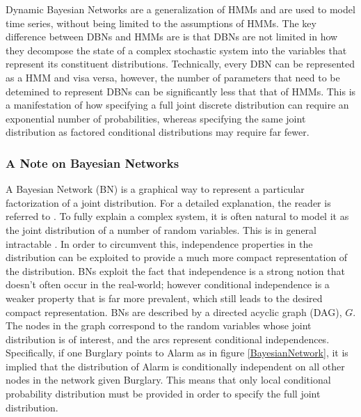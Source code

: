 
\placeholder{}
Dynamic Bayesian Networks are a generalization of HMMs and are used to model time series, without being limited to the assumptions of HMMs. The key difference between DBNs and HMMs are is that DBNs are not limited in how they decompose the state of a complex stochastic system into the variables that represent its constituent distributions\cite{AIAMA}. Technically, every DBN can be represented as a HMM and visa versa, however, the number of parameters that need to be detemined to represent DBNs can be significantly less that that of HMMs. This is a manifestation of how specifying a full joint discrete distribution can require an exponential number of probabilities, whereas specifying the same joint distribution as factored conditional distributions may require far fewer.

\subsubsection{A Note on Bayesian Networks}
A Bayesian Network (BN) is a graphical way to represent a particular factorization of a joint distribution. For a detailed explanation, the reader is referred to \cite{KollerPGM}. To fully explain a complex system, it is often natural to model it as the joint distribution of a number of random variables. This is in general intractable \cite{KollerPGM}. In order to circumvent this, independence properties in the distribution can be exploited to provide a much more compact representation of the distribution. BNs exploit the fact that independence is a strong notion that doesn't often occur in the real-world; however conditional independence is a weaker property that is far more prevalent, which still leads to the desired compact representation. BNs are described by a directed acyclic graph (DAG), $G$. The nodes in the graph correspond to the random variables whose joint distribution is of interest, and the arcs represent conditional independences. Specifically, if one Burglary points to Alarm as in figure \ref{BayesianNetwork}, it is implied that the distribution of Alarm is conditionally independent on all other nodes in the network given Burglary. This means that only local conditional probability distribution must be provided in order to specify the full joint distribution.


